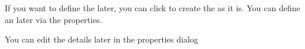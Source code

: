 If you want to define the \gdaut{} later, you can click  to create the \gdproject{} as it is. You can define an \gdaut{} later via the \gdproject{} properties. 

You can edit the \gdproject{} details later in the \gdproject{} properties dialog 
\clearpage



